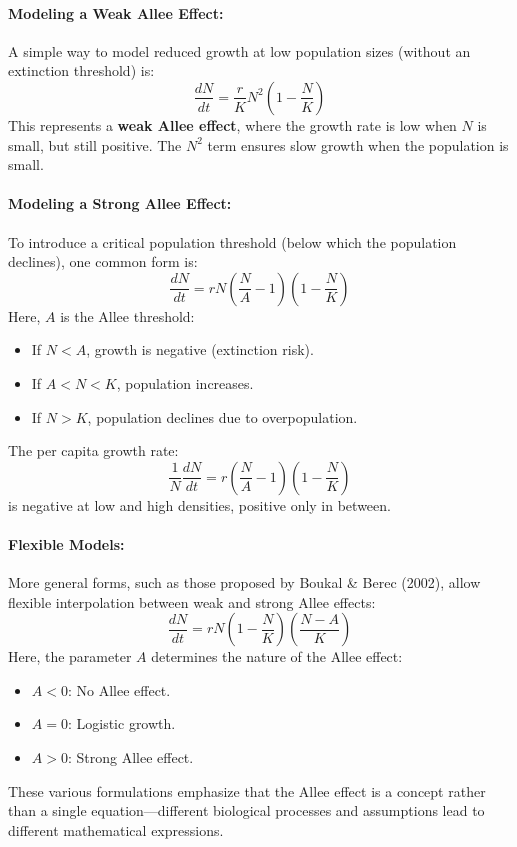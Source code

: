 \documentclass{article}
\begin{document}
\paragraph{Modeling a Weak Allee Effect:}
A simple way to model reduced growth at low population sizes (without an extinction threshold) is:
\[
\frac{dN}{dt} = \frac{r}{K}N^2\left(1 - \frac{N}{K} \right)
\]
This represents a \textbf{weak Allee effect}, where the growth rate is low when $N$ is small, but still positive. The $N^2$ term ensures slow growth when the population is small.

\paragraph{Modeling a Strong Allee Effect:}
To introduce a critical population threshold (below which the population declines), one common form is:
\[
\frac{dN}{dt} = rN\left(\frac{N}{A} - 1\right)\left(1 - \frac{N}{K}\right)
\]
Here, $A$ is the Allee threshold:
\begin{itemize}
    \item If $N < A$, growth is negative (extinction risk).
    \item If $A < N < K$, population increases.
    \item If $N > K$, population declines due to overpopulation.
\end{itemize}
The per capita growth rate:
\[
\frac{1}{N}\frac{dN}{dt} = r\left(\frac{N}{A} - 1\right)\left(1 - \frac{N}{K}\right)
\]
is negative at low and high densities, positive only in between.

\paragraph{Flexible Models:}
More general forms, such as those proposed by Boukal \& Berec (2002), allow flexible interpolation between weak and strong Allee effects:
\[
\frac{dN}{dt} = rN\left(1 - \frac{N}{K} \right)\left( \frac{N - A}{K} \right)
\]
Here, the parameter $A$ determines the nature of the Allee effect:
\begin{itemize}
    \item $A < 0$: No Allee effect.
    \item $A = 0$: Logistic growth.
    \item $A > 0$: Strong Allee effect.
\end{itemize}

These various formulations emphasize that the Allee effect is a concept rather than a single equation—different biological processes and assumptions lead to different mathematical expressions.
\end{document}
